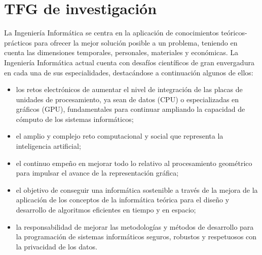 \section{TFG de investigación}
\label{appendix:investigacion}


La Ingeniería Informática se centra en la aplicación de conocimientos teóricos-prácticos para ofrecer la mejor solución posible a un problema, teniendo en cuenta las dimensiones temporales, personales, materiales y económicas. La Ingeniería Informática actual cuenta con desafíos científicos de gran envergadura en cada una de sus especialidades, destacándose a continuación algunos de ellos:
\begin{itemize}
    \item los retos electrónicos de aumentar el nivel de integración de las placas de unidades de procesamiento, ya sean de datos (CPU) o especializadas en gráficos (GPU), fundamentales para continuar ampliando la capacidad de cómputo de los sistemas informáticos;
    \item el amplio y complejo reto computacional y social que representa la inteligencia artificial;
    \item el continuo empeño en mejorar todo lo relativo al procesamiento geométrico para impulsar el avance de la representación gráfica;
    \item el objetivo de conseguir una informática sostenible a través de la mejora de la aplicación de los conceptos de la informática teórica para el diseño y desarrollo de algoritmos eficientes en tiempo y en espacio;
    \item la responsabilidad de mejorar las metodologías y métodos de desarrollo para la programación de sistemas informáticos seguros, robustos y respetuosos con la privacidad de los datos.
\end{itemize}

